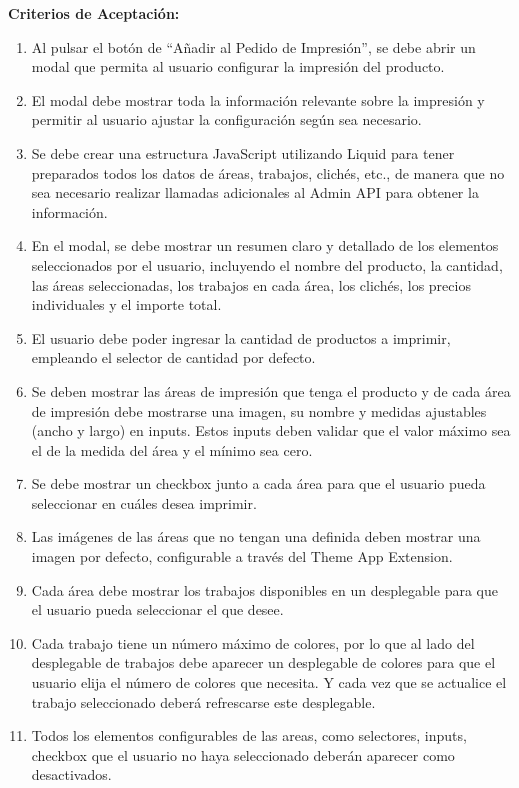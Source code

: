 \documentclass[12pt]{article}
\begin{document}
\vspace{0.5cm}
\textbf{Criterios de Aceptación:}
\begin{enumerate}[label=\arabic*.]
    \item Al pulsar el botón de ``Añadir al Pedido de Impresión'', se debe abrir un modal que permita al usuario configurar la impresión del producto.
    \item El modal debe mostrar toda la información relevante sobre la impresión y permitir al usuario ajustar la configuración según sea necesario.
    \item Se debe crear una estructura JavaScript utilizando Liquid para tener preparados todos los datos de áreas, trabajos, clichés, etc., de manera que no sea necesario realizar llamadas adicionales al Admin API para obtener la información.
    \item En el modal, se debe mostrar un resumen claro y detallado de los elementos seleccionados por el usuario, incluyendo el nombre del producto, la cantidad, las áreas seleccionadas, los trabajos en cada área, los clichés, los precios individuales y el importe total.
    \item El usuario debe poder ingresar la cantidad de productos a imprimir, empleando el selector de cantidad por defecto.
    \item Se deben mostrar las áreas de impresión que tenga el producto y de cada área de impresión debe mostrarse una imagen, su nombre y medidas ajustables (ancho y largo) en inputs. Estos inputs deben validar que el valor máximo sea el de la medida del área y el mínimo sea cero.
    \item Se debe mostrar un checkbox junto a cada área para que el usuario pueda seleccionar en cuáles desea imprimir.
    \item Las imágenes de las áreas que no tengan una definida deben mostrar una imagen por defecto, configurable a través del Theme App Extension.
    \item Cada área debe mostrar los trabajos disponibles en un desplegable para que el usuario pueda seleccionar el que desee.
    \item Cada trabajo tiene un número máximo de colores, por lo que al lado del desplegable de trabajos debe aparecer un desplegable de colores para que el usuario elija el número de colores que necesita. Y cada vez que se actualice el trabajo seleccionado deberá refrescarse este desplegable.
    \item Todos los elementos configurables de las areas, como selectores, inputs, checkbox que el usuario no haya seleccionado deberán aparecer como desactivados.

\end{enumerate}
\end{document}
